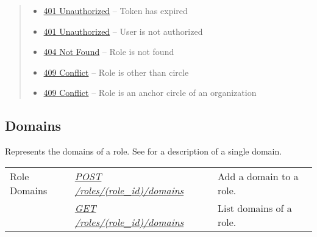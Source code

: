 \documentclass[letterpaper,10pt,english]{sphinxmanual}
\begin{document}
\begin{fulllineitems}
\begin{quote}
\begin{description}
\begin{itemize}
\item {} 
\href{http://www.w3.org/Protocols/rfc2616/rfc2616-sec10.html\#sec10.4.2}{401 Unauthorized} -- Token has expired

\item {} 
\href{http://www.w3.org/Protocols/rfc2616/rfc2616-sec10.html\#sec10.4.2}{401 Unauthorized} -- User is not authorized

\item {} 
\href{http://www.w3.org/Protocols/rfc2616/rfc2616-sec10.html\#sec10.4.5}{404 Not Found} -- Role is not found

\item {} 
\href{http://www.w3.org/Protocols/rfc2616/rfc2616-sec10.html\#sec10.4.10}{409 Conflict} -- Role is other than circle

\item {} 
\href{http://www.w3.org/Protocols/rfc2616/rfc2616-sec10.html\#sec10.4.10}{409 Conflict} -- Role is an anchor circle of an organization

\end{itemize}

\end{description}\end{quote}

\end{fulllineitems}



\subsection{Domains}
\label{\detokenize{resources/role:domains}}
Represents the domains of a role. See {\hyperref[\detokenize{resources/domain:domain}]{}} for a description of a single domain.

\noindent\begin{tabulary}{\linewidth}{|L|L|L|}
\hline
{}\relax &\relax &\relax \\
\hline
Role Domains
&
{\hyperref[\detokenize{resources/role:post--roles-(role_id)-domains}]{\emph{POST /roles/(role\_id)/domains}}}
&
Add a domain to a role.
\\
\hline&
{\hyperref[\detokenize{resources/role:get--roles-(role_id)-domains}]{\emph{GET /roles/(role\_id)/domains}}}
&
List domains of a role.
\\
\hline\end{tabulary}
\end{document}
